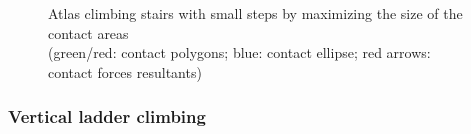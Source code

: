 \begin{figure}
\centering
\setlength\fboxsep{0pt}
\setlength\fboxrule{1pt}
\caption{Atlas climbing stairs with small steps by maximizing the size of the contact areas\\(green/red: contact polygons; blue: contact ellipse; red arrows: contact forces resultants)}
\label{fig:atlas_SmallStairs}
\end{figure}



\subsubsection{Vertical ladder climbing}
\label{subsubsec:ladder}


